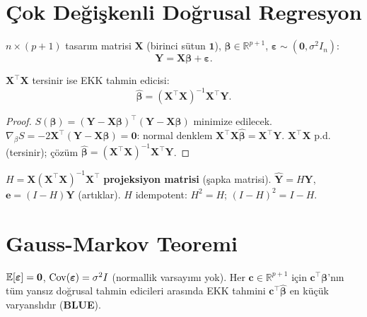 \section{Çok Değişkenli Doğrusal Regresyon}
\label{sec:cok_regresyon}

\begin{tanim}\label{def:matris_model}
$n\times(p+1)$ tasarım matrisi $\mathbf{X}$ (birinci sütun $\mathbf{1}$), $\boldsymbol{\beta}\in\mathbb{R}^{p+1}$, $\boldsymbol{\varepsilon}\sim(\mathbf{0},\sigma^2 I_n)$:
\[
  \mathbf{Y} = \mathbf{X}\boldsymbol{\beta} + \boldsymbol{\varepsilon}.
\]
\end{tanim}

\begin{teorem}\label{thm:cok_ekk}
$\mathbf{X}^\top\mathbf{X}$ tersinir ise EKK tahmin edicisi:
\[
  \hat{\boldsymbol{\beta}} = (\mathbf{X}^\top\mathbf{X})^{-1}\mathbf{X}^\top\mathbf{Y}.
\]
\end{teorem}

\begin{proof}
$S(\boldsymbol{\beta})=(\mathbf{Y}-\mathbf{X}\boldsymbol{\beta})^\top(\mathbf{Y}-\mathbf{X}\boldsymbol{\beta})$ minimize edilecek. $\nabla_\beta S = -2\mathbf{X}^\top(\mathbf{Y}-\mathbf{X}\boldsymbol{\beta})=\mathbf{0}$: normal denklem $\mathbf{X}^\top\mathbf{X}\hat{\boldsymbol{\beta}}=\mathbf{X}^\top\mathbf{Y}$. $\mathbf{X}^\top\mathbf{X}$ p.d. (tersinir); çözüm $\hat{\boldsymbol{\beta}}=(\mathbf{X}^\top\mathbf{X})^{-1}\mathbf{X}^\top\mathbf{Y}$.
\end{proof}

\begin{teorem}\label{thm:sapka_matris}
$H = \mathbf{X}(\mathbf{X}^\top\mathbf{X})^{-1}\mathbf{X}^\top$ \textbf{projeksiyon matrisi} (şapka matrisi). $\hat{\mathbf{Y}}=H\mathbf{Y}$, $\mathbf{e}=(I-H)\mathbf{Y}$ (artıklar). $H$ idempotent: $H^2=H$; $(I-H)^2=I-H$.
\end{teorem}

\section{Gauss-Markov Teoremi}
\label{sec:gauss_markov}

\begin{teorem}\label{thm:gauss_markov}
$\mathbb{E}[\boldsymbol{\varepsilon}]=\mathbf{0}$, $\operatorname{Cov}(\boldsymbol{\varepsilon})=\sigma^2 I$ (normallik varsayımı yok). Her $\mathbf{c}\in\mathbb{R}^{p+1}$ için $\mathbf{c}^\top\boldsymbol{\beta}$'nın tüm yansız doğrusal tahmin edicileri arasında EKK tahmini $\mathbf{c}^\top\hat{\boldsymbol{\beta}}$ en küçük varyanslıdır (\textbf{BLUE}).
\end{teorem}

